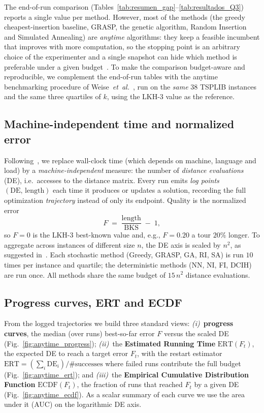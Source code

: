 \documentclass[conference]{IEEEtran}
\begin{document}
The end-of-run comparison (Tables~\ref{tab:resumen_gap}--\ref{tab:resultados_Q3})
reports a single value per method. However, most of the methods (the greedy
cheapest-insertion baseline, GRASP, the genetic algorithm, Random Insertion and
Simulated Annealing) are \emph{anytime} algorithms: they
keep a feasible incumbent that improves with more computation, so the stopping
point is an arbitrary choice of the experimenter and a single snapshot can hide
which method is preferable under a given budget~\cite{weise2014benchmarking}. To
make the comparison budget-aware and reproducible, we complement the end-of-run
tables with the anytime benchmarking procedure of
Weise~\textit{et~al.}~\cite{weise2014benchmarking}, run on the \emph{same} 38
TSPLIB instances and the same three quartiles of $k$, using the LKH-3 value as the
reference.

\subsection{Machine-independent time and normalized error}
Following~\cite{weise2014benchmarking}, we replace wall-clock time (which depends
on machine, language and load) by a \emph{machine-independent} measure: the number
of \emph{distance evaluations} (DE), i.e.\ accesses to the distance matrix. Every
run emits \emph{log points} $(\mathrm{DE},\,\text{length})$ each time it produces
or updates a solution, recording the full optimization \emph{trajectory} instead
of only its endpoint. Quality is the normalized error
\begin{equation}
F \;=\; \frac{\text{length}}{\text{BKS}} \;-\; 1 ,
\end{equation}
so $F=0$ is the LKH-3 best-known value and, e.g., $F=0.20$ a tour $20\%$ longer.
To aggregate across instances of different size $n$, the DE axis is scaled by
$n^2$, as suggested in~\cite{weise2014benchmarking}. Each stochastic method
(Greedy, GRASP, GA, RI, SA) is run $10$ times per instance and quartile; the
deterministic methods (NN, NI, FI, DCIH) are run once. All
methods share the same budget of $15\,n^2$ distance evaluations.

\subsection{Progress curves, ERT and ECDF}
From the logged trajectories we build three standard views:
\emph{(i)}~\textbf{progress curves}, the median (over runs) best-so-far error $F$
versus the scaled DE (Fig.~\ref{fig:anytime_progress});
\emph{(ii)}~the \textbf{Estimated Running Time} $\mathrm{ERT}(F_t)$, the expected
DE to reach a target error $F_t$, with the restart estimator
$\mathrm{ERT}=(\sum_i \mathrm{DE}_i)/\#\text{successes}$ where failed runs
contribute the full budget (Fig.~\ref{fig:anytime_ert}); and
\emph{(iii)}~the \textbf{Empirical Cumulative Distribution Function}
$\mathrm{ECDF}(F_t)$, the fraction of runs that reached $F_t$ by a given DE
(Fig.~\ref{fig:anytime_ecdf}). As a scalar summary of each curve we use the area
under it (AUC) on the logarithmic DE axis.
\end{document}
